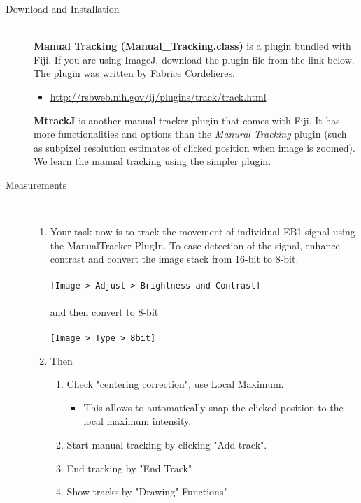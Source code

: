 \documentclass[11pnt]{article}
\begin{document}
\begin{description}
\item[Download and Installation]\hfill\\

\textbf{Manual Tracking (Manual\_Tracking.class)} is a plugin bundled with Fiji. If you are using ImageJ, download the plugin file from the link below. The plugin was written by Fabrice Cordelieres.
\begin{itemize}
\item \url{http://rsbweb.nih.gov/ij/plugins/track/track.html}
\end{itemize}

\textbf{MtrackJ} is another manual tracker plugin that comes with Fiji. It has more functionalities and options than the \textit{Manural Tracking} plugin (such as subpixel resolution estimates of clicked position when image is zoomed). We learn the manual tracking using the simpler plugin. 

\item[Measurements]\hfill\\

\begin{enumerate}
\item Your task now is to track the movement of individual EB1 signal using the ManualTracker PlugIn. To ease detection of the signal, enhance contrast and convert the image stack from 16-bit to 8-bit.
\\
\\
\verb"[Image > Adjust > Brightness and Contrast]"
\\
\\
and then convert to 8-bit
\\
\\
\verb"[Image > Type > 8bit]"
\\
\item Then 
\begin{enumerate}
\item Check "centering correction", use Local Maximum.
  \begin{itemize}
      \item This allows to automatically snap the clicked position to the local maximum intensity. 
  \end{itemize}
\item Start manual tracking by clicking "Add track".
\item End tracking by "End Track"
\item Show tracks by "Drawing" Functions"
\end{enumerate}


\end{enumerate}
\end{description}
\end{document}
